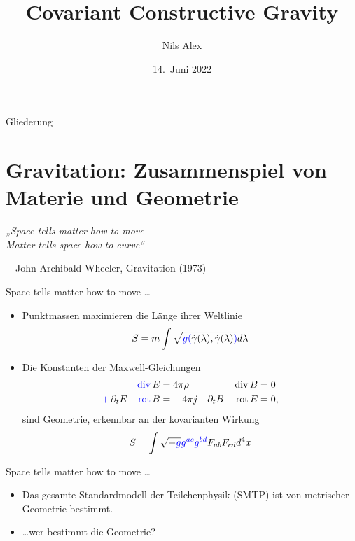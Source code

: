\documentclass{beamer}
\title{Covariant Constructive Gravity}
\date{14.\ Juni 2022}
\author{Nils Alex}
\institute{FAU Erlangen-Nürnberg}
\begin{document}
    \maketitle

    \begin{frame}{Gliederung}
        \tableofcontents[pausesections]
    \end{frame}


    \section{Gravitation: Zusammenspiel von Materie und Geometrie}\label{sec:materie-und-geometrie}

    \begin{frame}{}
        \Large
        \textit{„Space tells matter how to move \\
        Matter tells space how to curve“}

        \normalsize
        ---John Archibald Wheeler, Gravitation (1973)
    \end{frame}

    \begin{frame}{Space tells matter how to move \ldots}
        \begin{itemize}
            \item {\setlength{\belowdisplayskip}{-5pt}Punktmassen maximieren die {\color{blue}Länge} ihrer Weltlinie
                \[ S = m \int \sqrt{{\color{blue}g(}\dot\gamma(\lambda),\dot\gamma(\lambda){\color{blue})}} d\lambda \]} \pause
            \item Die Konstanten der Maxwell-Gleichungen
            \begin{align*}
                \mathop{\color{blue}\operatorname{div}} E &= 4\pi \rho & \operatorname{div} B &= 0 \\
                \mathop{\color{blue}+} \partial_t E \mathop{\color{blue}-} \mathop{\color{blue}\operatorname{rot}} B &= \mathop{\color{blue}-}4\pi j & \partial_t B + \operatorname{rot} E &= 0,
            \end{align*}
            sind Geometrie, erkennbar an der kovarianten Wirkung
            \[
                S = \int \sqrt{-\color{blue}g}{\color{blue}g^{ac}g^{bd}} F_{ab} F_{cd} d^4 x
            \]
        \end{itemize}
    \end{frame}

    \begin{frame}{Space tells matter how to move \ldots}
        \begin{itemize}
            \item Das gesamte Standardmodell der Teilchenphysik (SMTP) ist von metrischer Geometrie bestimmt. \pause
            \item \ldots wer bestimmt die Geometrie?
        \end{itemize}
    \end{frame}
\end{document}
